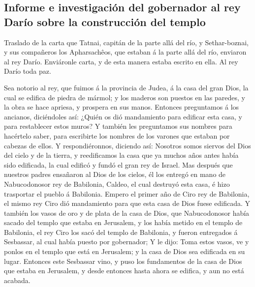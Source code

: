 \hypertarget{informe-e-investigaciuxf3n-del-gobernador-al-rey-daruxedo-sobre-la-construcciuxf3n-del-templo}{%
\subsection{Informe e investigación del gobernador al rey Darío sobre la
construcción del
templo}\label{informe-e-investigaciuxf3n-del-gobernador-al-rey-daruxedo-sobre-la-construcciuxf3n-del-templo}}

 Traslado de la carta que Tatnai, capitán de la parte allá
del río, y Sethar-boznai, y sus compañeros los Apharsachêos, que estaban
á la parte allá del río, enviaron al rey Darío. 
Enviáronle carta, y de esta manera estaba escrito en ella. Al rey Darío
toda paz.

 Sea notorio al rey, que fuimos á la provincia de Judea, á
la casa del gran Dios, la cual se edifica de piedra de mármol; y los
maderos son puestos en las paredes, y la obra se hace apriesa, y
prospera en sus manos.  Entonces preguntamos á los
ancianos, diciéndoles así: ¿Quién os dió mandamiento para edificar esta
casa, y para restablecer estos muros?  Y también les
preguntamos sus nombres para hacértelo saber, para escribirte los
nombres de los varones que estaban por cabezas de ellos. 
Y respondiéronnos, diciendo así: Nosotros somos siervos del Dios del
cielo y de la tierra, y reedificamos la casa que ya muchos años antes
había sido edificada, la cual edificó y fundó el gran rey de Israel.
 Mas después que nuestros padres ensañaron al Dios de los
cielos, él los entregó en mano de Nabucodonosor rey de Babilonia,
Caldeo, el cual destruyó esta casa, é hizo trasportar el pueblo á
Babilonia.  Empero el primer año de Ciro rey de
Babilonia, el mismo rey Ciro dió mandamiento para que esta casa de Dios
fuese edificada.  Y también los vasos de oro y de plata
de la casa de Dios, que Nabucodonosor había sacado del templo que estaba
en Jerusalem, y los había metido en el templo de Babilonia, el rey Ciro
los sacó del templo de Babilonia, y fueron entregados á Sesbassar, al
cual había puesto por gobernador;  Y le dijo: Toma estos
vasos, ve y ponlos en el templo que está en Jerusalem; y la casa de Dios
sea edificada en su lugar.  Entonces este Sesbassar vino,
y puso los fundamentos de la casa de Dios que estaba en Jerusalem, y
desde entonces hasta ahora se edifica, y aun no está acabada.

